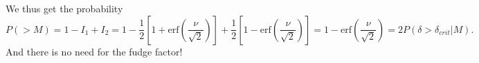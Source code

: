 \documentclass[a4paper,norsk, 10pt]{article}
\begin{document}
We thus get the probability
\begin{equation}
P(>M) = 1-I_1 + I_2 = 1 - \frac{1}{2}\left[1+\text{erf}\left(\frac{\nu}{\sqrt{2}}\right)\right] + \frac{1}{2}\left[1-\text{erf}\left(\frac{\nu}{\sqrt{2}}\right)\right] = 1 - \text{erf}\left(\frac{\nu}{\sqrt{2}}\right) = 2P(\delta > \delta_{crit}|M).
\end{equation}
And there is no need for the fudge factor!
\end{document}
